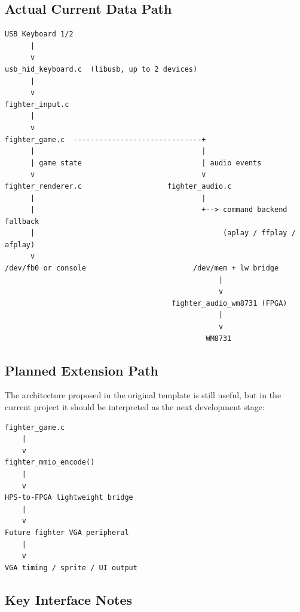 \documentclass[12pt,a4paper]{article}
\begin{document}
\subsection{Actual Current Data Path}

\begin{lstlisting}[style=fighterstyle]
USB Keyboard 1/2
      |
      v
usb_hid_keyboard.c  (libusb, up to 2 devices)
      |
      v
fighter_input.c
      |
      v
fighter_game.c  ------------------------------+
      |                                       |
      | game state                            | audio events
      v                                       v
fighter_renderer.c                    fighter_audio.c
      |                                       |
      |                                       +--> command backend fallback
      |                                            (aplay / ffplay / afplay)
      v
/dev/fb0 or console                         /dev/mem + lw bridge
                                                  |
                                                  v
                                       fighter_audio_wm8731 (FPGA)
                                                  |
                                                  v
                                               WM8731
\end{lstlisting}

\subsection{Planned Extension Path}

The architecture proposed in the original template is still useful, but in the current project it should be interpreted as the next development stage:

\begin{lstlisting}[style=fighterstyle]
fighter_game.c
    |
    v
fighter_mmio_encode()
    |
    v
HPS-to-FPGA lightweight bridge
    |
    v
Future fighter VGA peripheral
    |
    v
VGA timing / sprite / UI output
\end{lstlisting}

\subsection{Key Interface Notes}
\end{document}
